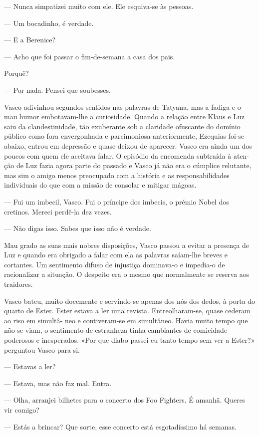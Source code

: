 --- Nunca simpatizei muito com ele. Ele esquiva-se às pessoas.

--- Um bocadinho, é verdade.

--- E a Berenice?

--- Acho que foi passar o fim-de-semana a casa dos pais.


Porquê?

--- Por nada. Pensei que soubesses.


Vasco adivinhou segundos sentidos nas palavras de Tatyana, mas a
fadiga e o mau humor embotavam-lhe a curiosidade. Quando a relação entre
Klaus e Luz saiu da clandestinidade, tão exuberante sob a claridade
ofuscante do domínio público como fora envergonhada e parcimoniosa
anteriormente, Ezequias foi-se abaixo, entrou em depressão e quase
deixou de aparecer. Vasco era ainda um dos poucos com quem ele aceitava
falar. O episódio da encomenda subtraída à aten- ção de Luz fazia agora
parte do passado e Vasco já não era o cúmplice relutante, mas sim o
amigo menos preocupado com a história e as responsabilidades individuais
do que com a missão de consolar e mitigar mágoas.

--- Fui um imbecil, Vasco. Fui o príncipe dos imbecis, o prémio Nobel dos
  cretinos. Mereci perdê-la dez vezes.


--- Não digas isso. Sabes que isso não é verdade.


Mau grado as suas mais nobres disposições, Vasco passou a evitar a
presença de Luz e quando era obrigado a falar com ela as palavras
saíam-lhe breves e cortantes. Um sentimento difuso de injustiça
dominava-o e impedia-o de racionalizar a situação. O despeito era o
mesmo que normalmente se reserva aos traidores.

Vasco bateu, muito docemente e servindo-se apenas dos nós dos dedos, à
porta do quarto de Ester. Ester estava a ler uma revista.
Entreolharam-se, quase cederam ao riso em simultâ- neo e contiveram-se
em simultâneo. Havia muito tempo que não se viam, o sentimento de
estranheza tinha cambiantes de comicidade poderosos e inesperados. «Por
que diabo passei eu tanto tempo sem ver a Ester?» perguntou Vasco para
si.

--- Estavas a ler?

--- Estava, mas não faz mal. Entra.

--- Olha, arranjei bilhetes para o concerto dos Foo Fighters. É amanhã.
  Queres vir comigo?

--- Estás a brincar? Que sorte, esse concerto está esgotadíssimo há
  semanas.

